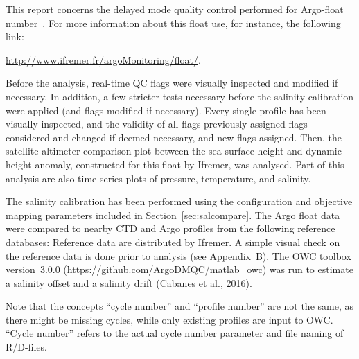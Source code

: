 \documentclass{article}
\begin{document}
This report concerns the delayed mode quality control performed for
Argo-float number~\WMOnum. For more information about this float use, for
instance, the following link:
\begin{center}
\href{url}{http://www.ifremer.fr/argoMonitoring/float/\WMOnum}.  
\end{center}
Before the analysis, real-time QC flags were visually inspected and
modified if necessary.  In addition, a few stricter tests necessary before
the salinity calibration were applied (and flags modified if necessary).
% 
Every single profile has been visually inspected, and the validity of all
flags previously assigned flags considered and changed if deemed
necessary, and new flags assigned.
%
Then, the satellite altimeter comparison plot between the sea surface
height and dynamic height anomaly, constructed for this float by Ifremer,
was analysed.
%
Part of this analysis are also time series plots of pressure, temperature,
and salinity.



The salinity calibration has been performed using the configuration and objective
mapping parameters included in Section~\ref{sec:salcompare}.
The Argo float data were compared to nearby CTD and Argo profiles from the
following reference databases: \small{{}}
%
Reference data are distributed by Ifremer. A simple visual check on the
reference data is done prior to analysis (see Appendix~B).
%
The OWC toolbox version~3.0.0 %
(\href{url}{https://github.com/ArgoDMQC/matlab\_owc}) was run to estimate
a salinity offset and a salinity drift (Cabanes et al., 2016).

Note that the concepts ``cycle number'' and ``profile number'' are
not the same, as there might be missing cycles, while only existing
profiles are input to OWC. ``Cycle number'' refers to the actual cycle
number parameter and file naming of R/D-files.
\end{document}
